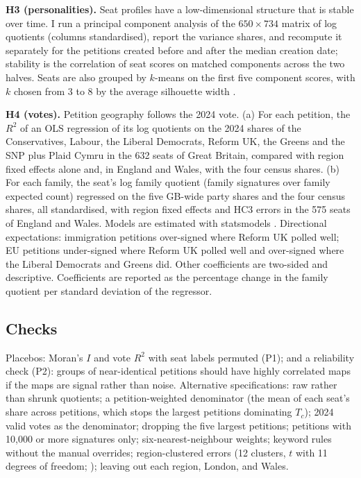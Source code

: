 \documentclass[11pt,a4paper]{article}
\begin{document}
\textbf{H3 (personalities).} Seat profiles have a low-dimensional structure that is stable over time. I run a principal component analysis \citep{jolliffecadima2016} of the $650\times734$ matrix of log quotients (columns standardised), report the variance shares, and recompute it separately for the petitions created before and after the median creation date; stability is the correlation of seat scores on matched components across the two halves. Seats are also grouped by $k$-means on the first five component scores, with $k$ chosen from 3 to 8 by the average silhouette width \citep{rousseeuw1987}.

\textbf{H4 (votes).} Petition geography follows the 2024 vote. (a) For each petition, the $R^2$ of an OLS regression of its log quotients on the 2024 shares of the Conservatives, Labour, the Liberal Democrats, Reform UK, the Greens and the SNP plus Plaid Cymru in the 632 seats of Great Britain, compared with region fixed effects alone and, in England and Wales, with the four census shares. (b) For each family, the seat's log family quotient (family signatures over family expected count) regressed on the five GB-wide party shares and the four census shares, all standardised, with region fixed effects and HC3 errors in the 575 seats of England and Wales. Models are estimated with statsmodels \citep{seabold2010}. Directional expectations: immigration petitions over-signed where Reform UK polled well; EU petitions under-signed where Reform UK polled well and over-signed where the Liberal Democrats and Greens did. Other coefficients are two-sided and descriptive. Coefficients are reported as the percentage change in the family quotient per standard deviation of the regressor.

\subsection{Checks}
Placebos: Moran's $I$ and vote $R^2$ with seat labels permuted (P1); and a reliability check (P2): groups of near-identical petitions should have highly correlated maps if the maps are signal rather than noise. Alternative specifications: raw rather than shrunk quotients; a petition-weighted denominator (the mean of each seat's share across petitions, which stops the largest petitions dominating $T_c$); 2024 valid votes as the denominator; dropping the five largest petitions; petitions with 10,000 or more signatures only; six-nearest-neighbour weights; keyword rules without the manual overrides; region-clustered errors (12 clusters, $t$ with 11 degrees of freedom; \citealt{cameronmiller2015}); leaving out each region, London, and Wales.
\end{document}
